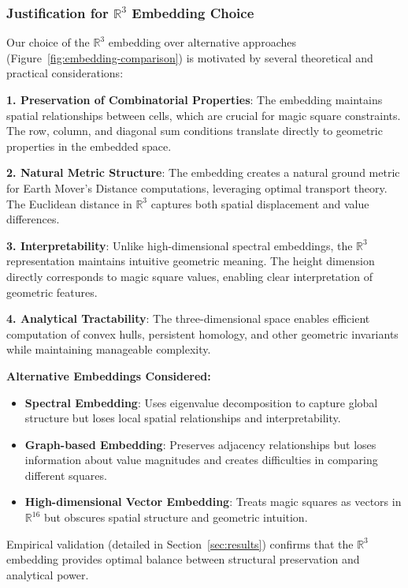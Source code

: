 \subsubsection{Justification for $\mathbb{R}^3$ Embedding Choice}

Our choice of the $\mathbb{R}^3$ embedding over alternative approaches (Figure~\ref{fig:embedding-comparison}) is motivated by several theoretical and practical considerations:

\textbf{1. Preservation of Combinatorial Properties}: The embedding maintains spatial relationships between cells, which are crucial for magic square constraints. The row, column, and diagonal sum conditions translate directly to geometric properties in the embedded space.

\textbf{2. Natural Metric Structure}: The embedding creates a natural ground metric for Earth Mover's Distance computations, leveraging optimal transport theory. The Euclidean distance in $\mathbb{R}^3$ captures both spatial displacement and value differences.

\textbf{3. Interpretability}: Unlike high-dimensional spectral embeddings, the $\mathbb{R}^3$ representation maintains intuitive geometric meaning. The height dimension directly corresponds to magic square values, enabling clear interpretation of geometric features.

\textbf{4. Analytical Tractability}: The three-dimensional space enables efficient computation of convex hulls, persistent homology, and other geometric invariants while maintaining manageable complexity.

\textbf{Alternative Embeddings Considered:}

\begin{itemize}
    \item \textbf{Spectral Embedding}: Uses eigenvalue decomposition to capture global structure but loses local spatial relationships and interpretability.
    \item \textbf{Graph-based Embedding}: Preserves adjacency relationships but loses information about value magnitudes and creates difficulties in comparing different squares.
    \item \textbf{High-dimensional Vector Embedding}: Treats magic squares as vectors in $\mathbb{R}^{16}$ but obscures spatial structure and geometric intuition.
\end{itemize}

Empirical validation (detailed in Section~\ref{sec:results}) confirms that the $\mathbb{R}^3$ embedding provides optimal balance between structural preservation and analytical power.


